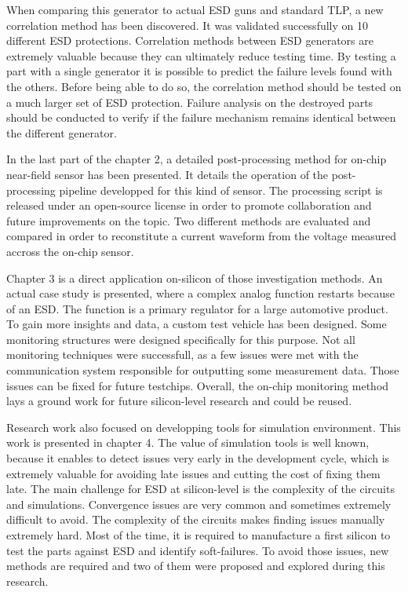 When comparing this generator to actual ESD guns and standard TLP, a new correlation method has been discovered.
It was validated successfully on 10 different ESD protections.
Correlation methods between ESD generators are extremely valuable because they can ultimately reduce testing time.
By testing a part with a single generator it is possible to predict the failure levels found with the others.
Before being able to do so, the correlation method should be tested on a much larger set of ESD protection.
Failure analysis on the destroyed parts should be conducted to verify if the failure mechanism remains identical between the different generator.

In the last part of the chapter 2, a detailed post-processing method for on-chip near-field sensor has been presented.
It details the operation of the post-processing pipeline developped for this kind of sensor.
The processing script is released \cite{} under an open-source license in order to promote collaboration and future improvements on the topic.
Two different methods are evaluated and compared in order to reconstitute a current waveform from the voltage measured accross the on-chip sensor.

Chapter 3 is a direct application on-silicon of those investigation methods.
An actual case study is presented, where a complex analog function restarts because of an ESD.
The function is a primary regulator for a large automotive product.
To gain more insights and data, a custom test vehicle has been designed.
Some monitoring structures were designed specifically for this purpose.
Not all monitoring techniques were successfull, as a few issues were met with the communication system responsible for outputting some measurement data.
Those issues can be fixed for future testchips.
Overall, the on-chip monitoring method lays a ground work for future silicon-level research and could be reused.

Research work also focused on developping tools for simulation environment.
This work is presented in chapter 4.
The value of simulation tools is well known, because it enables to detect issues very early in the development cycle, which is extremely valuable for avoiding late issues and cutting the cost of fixing them late.
The main challenge for ESD at silicon-level is the complexity of the circuits and simulations.
Convergence issues are very common and sometimes extremely difficult to avoid.
The complexity of the circuits makes finding issues manually extremely hard.
Most of the time, it is required to manufacture a first silicon to test the parts against ESD and identify soft-failures.
To avoid those issues, new methods are required and two of them were proposed and explored during this research.

